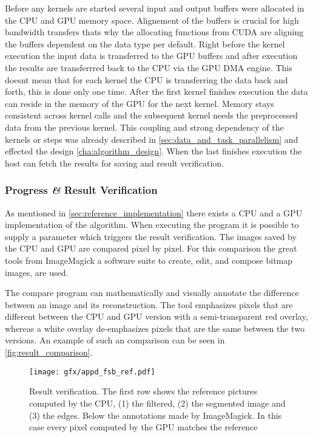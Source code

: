 Before any kernels are started several input and output buffers were allocated
in the \gls{CPU} and \gls{GPU} memory space. Alignement of the buffers is
crucial for high bandwidth transfers thats why the allocating functions from
\gls{CUDA} are aligning the buffers dependent on the data type per default.
Right before the kernel execution the input data is transferred to the \gls{GPU}
buffers and after execution the results are transferrred back to the \gls{CPU}
via the \gls{GPU} \gls{DMA} engine. This doesnt mean that for each kernel the
\gls{CPU} is transferring the data back and forth, this is done only one time.
After the first kernel finishes execution the data can reside in the memory of
the \gls{GPU} for the next kernel. Memory stays consistent across kernel calls
and the subsequent kernel needs the preprocessed data from the previous kernel.
This coupling and strong dependency of the kernels or steps was already
described in \autoref{sec:data_and_task_parallelism} and effected the design
\autoref{cha:algorithm_design}. When the last finishes execution the
host can fetch the results for saving and result verification. 

\subsubsection{Progress \textit{\&} Result Verification} %
\label{ssub:progress_result_verificationcation}
As mentioned in \autoref{sec:reference_implementation} there exists a \gls{CPU}
and a \gls{GPU} implementation of the algorithm. When executing the program
it is possible to supply a parameter which triggers the result verification. The
images saved by the \gls{CPU} and \gls{GPU} are compared pixel by pixel. For 
this comparison the great tools from ImageMagick a software suite to 
create, edit, and compose bitmap images, are used. 

The compare program can mathematically and visually annotate the difference 
between an image and its reconstruction. The tool emphasizes pixels that are 
different between the \gls{CPU} and \gls{GPU} version with a semi-transparent red
overlay, whereas a white overlay de-emphasizes pixels that are the same between
the two versions. An example of such an comparison can be seen in 
\autoref{fig:result_comparison}.

\begin{figure}[ht]
  \centering
 	\texttt{[image: gfx/appd\_fsb\_ref.pdf]}
  \caption{Result verification. The first row shows the reference pictures
	computed by the \protect\gls{CPU}, (1) the filtered, (2) the segmented image 
	and (3) the edges. Below the annotations made by ImageMagick. In this case
	every pixel computed by the \protect\gls{GPU} matches the reference}
  \label{fig:result_comparison}
\end{figure}

